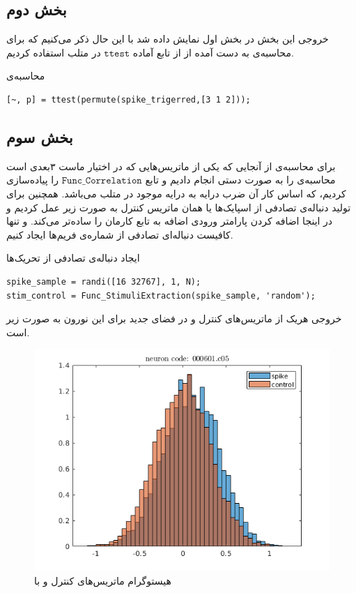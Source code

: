\documentclass[12pt,onecolumn,a4paper,fleqn]{article}
\newcommand{\pf}[1]{$\mathtt{#1}$}
\begin{document}
\subsection{بخش دوم}
خروجی این بخش در بخش اول نمایش داده‌ شد با این حال ذکر می‌کنیم که برای محاسبه‌ی  به دست آمده از  از تابع آماده  \pf{ttest}
در متلب استفاده کردیم.
\begin{code}{محاسبه‌ی }
	\begin{latin}
		\begin{lstlisting}[style=Matlab-editor, tabsize=2]
[~, p] = ttest(permute(spike_trigerred,[3 1 2]));
	\end{lstlisting}
	\end{latin}
\end{code}

\subsection{بخش سوم}
برای محاسبه‌ی  از آنجایی که یکی از ماتریس‌هایی که در اختیار ماست ۳بعدی است محاسبه‌ی  را به صورت دستی انجام دادیم و تابع 
\pf{Func\_Correlation}
را پیاده‌سازی کردیم، که اساس کار آن ضرب درایه به درایه موجود در متلب می‌باشد. همچنین برای تولید دنباله‌ی تصادفی از اسپایک‌ها یا همان ماتریس کنترل به صورت زیر عمل کردیم و در اینجا اضافه کردن پارامتر ورودی اضافه به تابع کارمان را ساده‌تر می‌کند. و تنها کافیست دنباله‌ای تصادفی از شماره‌ی فریم‌ها ایجاد کنیم.
\begin{code}{ایجاد دنباله‌ی تصادفی از تحریک‌ها}
	\begin{latin}
		\begin{lstlisting}[style=Matlab-editor, tabsize=2]
spike_sample = randi([16 32767], 1, N);
stim_control = Func_StimuliExtraction(spike_sample, 'random');
		\end{lstlisting}
	\end{latin}
\end{code}
خروجی هریک از ماتریس‌های کنترل و  در فضای جدید برای این نورون به صورت زیر است.
\begin{figure}[h]
	\centering
	\includegraphics[width=0.46\linewidth]{photos/sta-kernel-hist.png}
	\caption{
		هیستوگرام  ماتریس‌های کنترل و  با 
	}
\label{1}
\end{figure}
\end{document}
